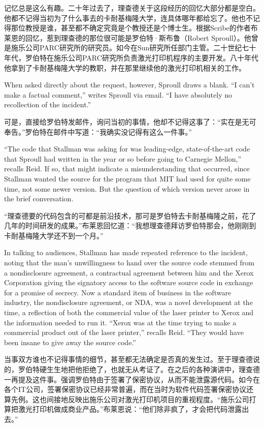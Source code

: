 \ifdefined\chs
记忆总是这么有趣。二十年过去了，理查德关于这段经历的回忆大部分都是空白。他都不记得当初为了什么事去的卡耐基梅隆大学，连具体哪年都给忘了。他也不记得那位教授是谁，甚至都不确定究竟是个教授还是个博士生。根据Scribe的作者布莱恩的回忆，惹到理查德的那位很可能是罗伯特·斯布鲁（Robert Sproull）。他曾是施乐公司PARC研究所的研究员。如今在Sun研究所任部门主管。二十世纪七十年代，罗伯特在施乐公司PARC研究所负责激光打印机程序的主要开发。八十年代他拿到了卡耐基梅隆大学的教职，并在那里继续他的激光打印机相关的工作。
\fi

\ifdefined\eng
When asked directly about the request, however, Sproull draws a blank. ``I can't make a factual comment,'' writes Sproull via email. ``I have absolutely no recollection of the incident.''
\fi

\ifdefined\chs
可是，直接给罗伯特发邮件，询问当初的事情，他却不记得这事了：“实在是无可奉告。”罗伯特在邮件中写道：“我确实没记得有这么一件事。”
\fi

\ifdefined\eng
``The code that Stallman was asking for was leading-edge, state-of-the-art code that Sproull had written in the year or so before going to Carnegie Mellon,'' recalls Reid.  If so, that might indicate a misunderstanding that occurred, since Stallman wanted the source for the program that MIT had used for quite some time, not some newer version. But the question of which version never arose in the brief conversation.
\fi

\ifdefined\chs
“理查德要的代码包含的可都是前沿技术，那可是罗伯特去卡耐基梅隆之前，花了几年的时间研发的成果。”布莱恩回忆道：“我想理查德拜访罗伯特那会，他刚刚到卡耐基梅隆大学还不到一个月。”
\fi

\ifdefined\eng
In talking to audiences, Stallman has made repeated reference to the incident, noting that the man's unwillingness to hand over the source code stemmed from a nondisclosure agreement, a contractual agreement between him and the Xerox Corporation giving the signatory access to the software source code in exchange for a promise of secrecy. Now a standard item of business in the software industry, the nondisclosure agreement, or NDA, was a novel development at the time, a reflection of both the commercial value of the laser printer to Xerox and the information needed to run it. ``Xerox was at the time trying to make a commercial product out of the laser printer,'' recalls Reid. ``They would have been insane to give away the source code.''
\fi

\ifdefined\chs
当事双方谁也不记得事情的细节，甚至都无法确定是否真的发生过。至于理查德说的，罗伯特硬生生地把他拒绝了，也就无从考证了。在之后的各种演讲中，理查德一再提及这件事。强调罗伯特由于签署了保密协议，从而不能泄露源代码。如今在各个IT公司，签署保密协议已经非常普遍，而在当时为软件代码签署保密协议还算先例。这也间接地反映出施乐公司对激光打印机项目的重视程度。“施乐公司打算把激光打印机做成商业产品。”布莱恩说：“他们除非疯了，才会把代码泄露出去。”
\fi

